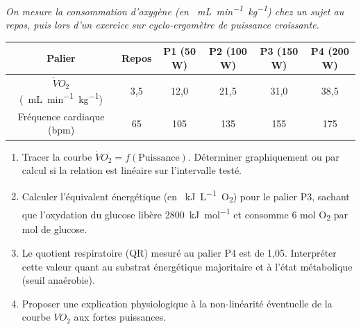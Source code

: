 \documentclass[11pt]{article}
\begin{document}
\begin{exercice}
    \textit{On mesure la consommation d'oxygène (en \SI{}{\mL.min^{-1}.kg^{-1}}) chez un sujet au repos, puis lors d'un exercice sur cyclo-ergomètre de puissance croissante.}
    \begin{center}
        \begin{tabular}{|c|c|c|c|c|c|}
            \hline
            \textbf{Palier} & \textbf{Repos} & \textbf{P1 (50 W)} & \textbf{P2 (100 W)} & \textbf{P3 (150 W)} & \textbf{P4 (200 W)} \\
            \hline
            $\dot{V}O_2$ (\SI{}{\mL.min^{-1}.kg^{-1}}) & 3,5 & 12,0 & 21,5 & 31,0 & 38,5 \\
            \hline
            Fréquence cardiaque (bpm) & 65 & 105 & 135 & 155 & 175 \\
            \hline
        \end{tabular}
    \end{center}
    \begin{enumerate}
        \item Tracer la courbe $\dot{V}O_2 = f(\text{Puissance})$. Déterminer graphiquement ou par calcul si la relation est linéaire sur l'intervalle testé.
        \item Calculer l'équivalent énergétique (en \SI{}{kJ.L^{-1}O_2}) pour le palier P3, sachant que l'oxydation du glucose libère \SI{2800}{kJ.mol^{-1}} et consomme 6 mol O\textsubscript{2} par mol de glucose.
        \item Le quotient respiratoire (QR) mesuré au palier P4 est de 1,05. Interpréter cette valeur quant au substrat énergétique majoritaire et à l'état métabolique (seuil anaérobie).
        \item Proposer une explication physiologique à la non-linéarité éventuelle de la courbe $\dot{V}O_2$ aux fortes puissances.
    \end{enumerate}
\end{exercice}
\end{document}
